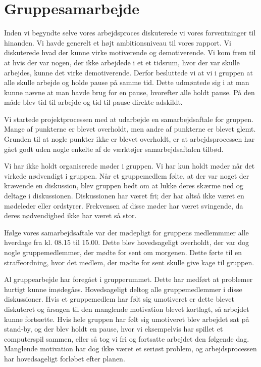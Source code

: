 \section{Gruppesamarbejde}
Inden vi begyndte selve vores arbejdsproces diskuterede vi vores forventninger til hinanden. Vi havde generelt et h\o{}jt ambitionsniveau til vores rapport. 
Vi diskuterede hvad der kunne virke motiverende og demotiverende. Vi kom frem til at hvis der var nogen, der ikke arbejdede i et et tidsrum, hvor der var skulle arbejdes, kunne det virke demotiverende.
Derfor besluttede vi at vi i gruppen at alle skulle arbejde og holde pause p\aa{} samme tid. Dette udm\o{}ntede sig i at man kunne n\ae{}vne at man havde brug for en pause, hvorefter alle holdt pause. 
P\aa{} den m\aa{}de blev tid til arbejde og tid til pause direkte adskildt.


Vi startede projektprocessen med at udarbejde en samarbejdsaftale for gruppen. Mange af punkterne er blevet overholdt, men andre af punkterne er blevet glemt. 
Grunden til at nogle punkter ikke er blevet overholdt, er at arbejdsprocessen har g\aa{}et godt uden nogle enkelte af de v\ae{}rkt\o{}jer samarbejdsaftalen tilb\o{}d.


Vi har ikke holdt organiserede m\o{}der i gruppen. Vi har kun holdt m\o{}der n\aa{}r det virkede n\o{}dvendigt i gruppen. 
N\aa{}r et gruppemedlem f\o{}lte, at der var noget der kr\ae{}vende en diskussion, blev gruppen bedt om at lukke deres sk\ae{}rme ned og deltage i diskussionen. 
Diskussionen har v\ae{}ret fri; der har alts\aa{} ikke v\ae{}ret en m\o{}deleder eller ordstyrer.
Frekvensen af disse m\o{}der har v\ae{}ret svingende, da deres n\o{}dvendighed ikke har v\ae{}ret s\aa{} stor.


If\o{}lge vores samarbejdsaftale var der m\o{}depligt for gruppens medlemmmer alle hverdage fra kl. 08.15 til 15.00. 
Dette blev hovedsageligt overholdt, der var dog nogle gruppemedlemmer, der m\o{}dte for sent om morgenen. 
Dette f\o{}rte til en straffeordning, hvor det medlem, der m\o{}dte for sent skulle give kage til gruppen. 


Al gruppearbejde har foreg\aa{}et i grupperummet. Dette har medf\o{}rt at problemer hurtigt kunne im\o{}deg\aa{}es. 
Hovedsageligt deltog alle gruppemedlemmer i disse diskussioner.
Hvis et gruppemedlem har f\o{}lt sig umotiveret er dette blevet diskuteret og \aa{}rsagen til den manglende motivation blevet kortlagt, s\aa{} arbejdet kunne forts\ae{}tte.
Hvis hele gruppen har f\o{}lt sig umotiveret blev arbejdet sat p\aa{} stand-by, og der blev holdt en pause, hvor vi eksempelvis har spillet et computerspil sammen, eller s\aa{} tog vi fri og fortsatte arbejdet den f\o{}lgende dag.
Manglende motivation har dog ikke v\ae{}ret et seri\o{}st problem, og arbejdsprocessen har hovedsageligt forl\o{}bet efter planen.


